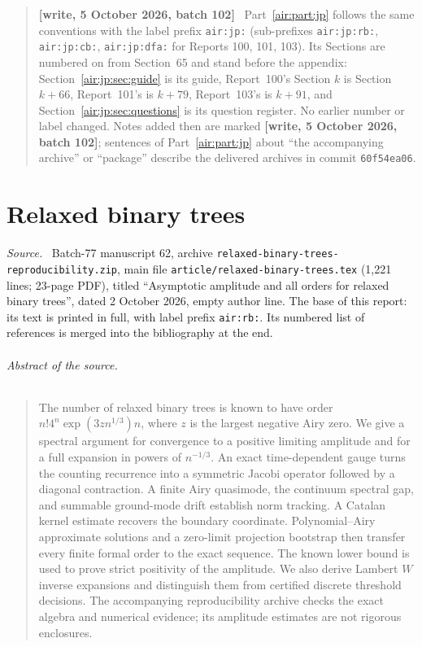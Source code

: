 \documentclass[11pt,letterpaper]{article}
\numberwithin{equation}{section}
\theoremstyle{remark}
\newenvironment{partsource}{\par\medskip\noindent\begin{minipage}{\linewidth}\small\raggedright\textit{Source.}\ }{\end{minipage}\par\medskip}
\newenvironment{writenotejp}{\par\smallskip\begin{quote}\small\textbf{[write, 5 October 2026, batch 102]}\ }{\end{quote}\smallskip}
\newcommand{\repopath}[1]{\nolinkurl{#1}}
\begin{document}
\begin{writenotejp}
Part~\ref{air:part:jp} follows the same conventions with the label prefix \texttt{air:jp:} (sub-prefixes \texttt{air:jp:rb:}, \texttt{air:jp:cb:}, \texttt{air:jp:dfa:} for Reports 100, 101, 103). Its Sections are numbered on from Section~65 and stand before the appendix: Section~\ref{air:jp:sec:guide} is its guide, Report~100's Section $k$ is Section $k+66$, Report~101's is $k+79$, Report~103's is $k+91$, and Section~\ref{air:jp:sec:questions} is its question register. No earlier number or label changed. Notes added then are marked \textbf{[write, 5 October 2026, batch 102]}; sentences of Part~\ref{air:part:jp} about ``the accompanying archive'' or ``package'' describe the delivered archives in commit \texttt{60f54ea06}.
\end{writenotejp}

\part{Relaxed binary trees}\label{air:part:rb}

\begin{partsource}
Batch-77 manuscript 62, archive \repopath{relaxed-binary-trees-reproducibility.zip}, main file \repopath{article/relaxed-binary-trees.tex} (1,221 lines; 23-page PDF), titled ``Asymptotic amplitude and all orders for relaxed binary trees'', dated 2 October 2026, empty author line. The base of this report: its text is printed in full, with label prefix \texttt{air:rb:}. Its numbered list of references is merged into the bibliography at the end.
\end{partsource}

\paragraph{Abstract of the source.}
\begin{quote}\small
The number of relaxed binary trees is known to have order
$n!4^n\exp(3zn^{1/3})n$, where $z$ is the largest negative Airy zero.
We give a spectral argument for convergence to a positive limiting amplitude and for a full expansion in powers of $n^{-1/3}$.
An exact time-dependent gauge turns the counting recurrence into a symmetric Jacobi operator followed by a diagonal contraction.
A finite Airy quasimode, the continuum spectral gap, and summable ground-mode drift establish norm tracking.
A Catalan kernel estimate recovers the boundary coordinate.
Polynomial--Airy approximate solutions and a zero-limit projection bootstrap then transfer every finite formal order to the exact sequence.
The known lower bound is used to prove strict positivity of the amplitude.
We also derive Lambert $W$ inverse expansions and distinguish them from certified discrete threshold decisions.
The accompanying reproducibility archive checks the exact algebra and numerical evidence; its amplitude estimates are not rigorous enclosures.
\end{quote}
\end{document}
